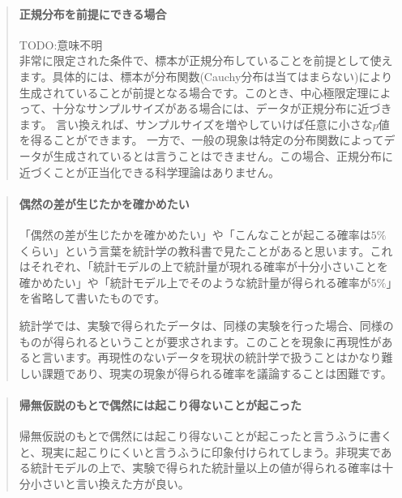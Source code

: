 \documentclass[a4paper,11pt,dvipdfmx]{jsarticle}
\begin{document}
\begin{mybox}
    \begin{quotation}
\paragraph{正規分布を前提にできる場合}
TODO:意味不明\\
非常に限定された条件で、標本が正規分布していることを前提として使えます。具体的には、標本が分布関数(Cauchy分布は当てはまらない)により生成されていることが前提となる場合です。このとき、中心極限定理によって、十分なサンプルサイズがある場合には、データが正規分布に近づきます。
言い換えれば、サンプルサイズを増やしていけば任意に小さな$p$値を得ることができます。
一方で、一般の現象は特定の分布関数によってデータが生成されているとは言うことはできません。この場合、正規分布に近づくことが正当化できる科学理論はありません。     
    \end{quotation}
\end{mybox}


\begin{mybox}
    \begin{quotation}
    \paragraph{偶然の差が生じたかを確かめたい}
    「偶然の差が生じたかを確かめたい」や「こんなことが起こる確率は$5\%$くらい」という言葉を統計学の教科書で見たことがあると思います。これはそれぞれ、「統計モデルの上で統計量が現れる確率が十分小さいことを確かめたい」や「統計モデル上でそのような統計量が得られる確率が$5\%$」を省略して書いたものです。
    
    統計学では、実験で得られたデータは、同様の実験を行った場合、同様のものが得られるということが要求されます。このことを現象に再現性があると言います。再現性のないデータを現状の統計学で扱うことはかなり難しい課題であり、現実の現象が得られる確率を議論することは困難です。
    \end{quotation}
    \end{mybox}
    
    
    \begin{mybox}
    \begin{quotation}
    \paragraph{帰無仮説のもとで偶然には起こり得ないことが起こった}
    帰無仮説のもとで偶然には起こり得ないことが起こったと言うふうに書くと、現実に起こりにくいと言うふうに印象付けられてしまう。非現実である統計モデルの上で、実験で得られた統計量以上の値が得られる確率は十分小さいと言い換えた方が良い。
    \end{quotation}
    \end{mybox}
    
\end{document}

